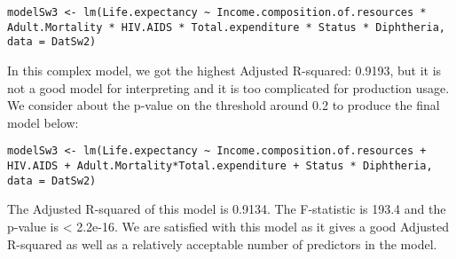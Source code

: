 \begin{verbatim}
modelSw3 <- lm(Life.expectancy ~ Income.composition.of.resources * Adult.Mortality * HIV.AIDS * Total.expenditure * Status * Diphtheria, data = DatSw2)
\end{verbatim}
In this complex model, we got the highest Adjusted R-squared: 0.9193, but it is not a good model for interpreting and it is too complicated for production usage. We consider about the p-value on the threshold around 0.2 to produce the final model below:

\begin{verbatim}
modelSw3 <- lm(Life.expectancy ~ Income.composition.of.resources + HIV.AIDS + Adult.Mortality*Total.expenditure + Status * Diphtheria, data = DatSw2)
\end{verbatim}
The Adjusted R-squared of this model is 0.9134. The F-statistic is 193.4 and the p-value is < 2.2e-16. We are satisfied with this model as it gives a good Adjusted R-squared as well as a relatively acceptable number of predictors in the model.
